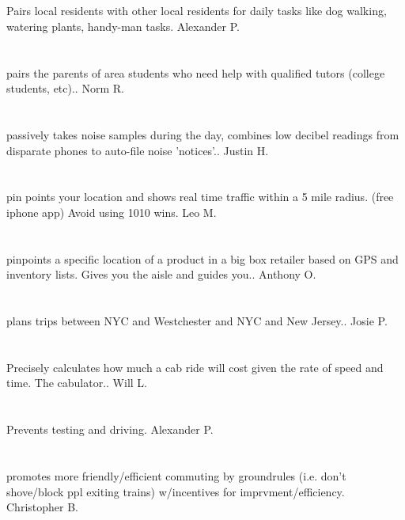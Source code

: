 \section{}Pairs local residents with other local residents for daily tasks like dog walking,  watering plants,  handy-man tasks. Alexander P.
\section{}pairs the parents of area students who need help with qualified tutors (college students,  etc).. Norm R.
\section{}passively takes noise samples during the day,  combines low decibel readings from disparate phones to auto-file noise 'notices'.. Justin H.
\section{} pin points your location and shows real time traffic within a 5 mile radius.  (free iphone app) Avoid using 1010 wins. Leo M.
\section{}pinpoints a specific location of a product in a big box retailer based on GPS and inventory lists.  Gives you the aisle and guides you.. Anthony O.
\section{} plans trips between NYC and Westchester and NYC and New Jersey.. Josie P.
\section{}Precisely calculates how much a cab ride will cost given the rate of speed and time. The cabulator.. Will L.
\section{}Prevents testing and driving. Alexander P.
\section{}promotes more friendly/efficient commuting by groundrules (i.e. don't shove/block ppl exiting trains) w/incentives for imprvment/efficiency. Christopher B.
